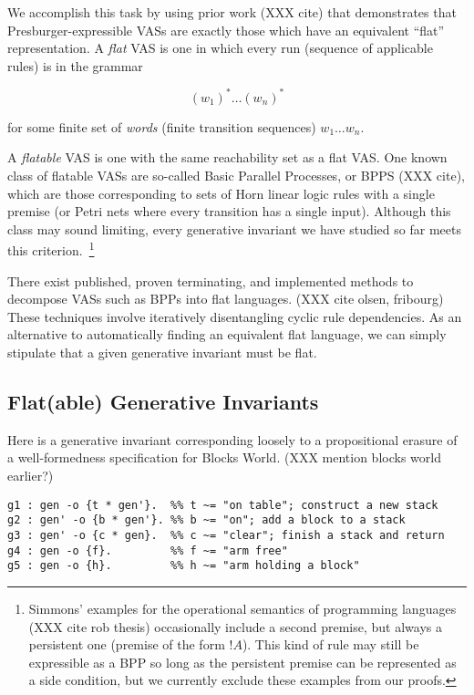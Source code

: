 \documentclass[fullpage, 11pt]{article}
\newcommand{\bang}{!}
\begin{document}
We accomplish this task by using prior work (XXX cite) that demonstrates
that Presburger-expressible VASs are exactly those which have an equivalent
``flat'' representation. A {\em flat} VAS is one in which every run
(sequence of applicable rules) is in the grammar

\[
(w_1)^*\dots(w_n)^*
\]

for some finite set of {\em words} (finite transition sequences) $w_1 \dots
w_n$.

A {\em flatable} VAS is one with the same reachability set as a flat VAS.
One known class of flatable VASs are so-called Basic Parallel Processes, or
BPPS (XXX cite), which are those corresponding to sets of Horn linear logic
rules with a single premise (or Petri nets where every transition has a
single input). Although this class may sound limiting, every generative
invariant we have studied so far meets this criterion.~\footnote{Simmons' examples
for the operational semantics of programming languages (XXX cite rob
thesis) occasionally include a second premise, but always a persistent one
(premise of the form $\bang A$). This kind of rule may still be expressible
as a BPP so long as the persistent premise can be represented as a side
condition, but we currently exclude these examples from our proofs.}

There exist published, proven terminating, and implemented methods to
decompose VASs such as BPPs into flat languages. (XXX cite olsen, fribourg)
These techniques involve iteratively disentangling cyclic rule
dependencies. As an alternative to automatically finding an equivalent flat
language, we can simply stipulate that a given generative invariant must be
flat.

\subsection{Flat(able) Generative Invariants}

Here is a generative invariant corresponding loosely to a propositional
erasure of a well-formedness specification for Blocks World. (XXX mention
blocks world earlier?)

\begin{verbatim}
g1 : gen -o {t * gen'}.  %% t ~= "on table"; construct a new stack
g2 : gen' -o {b * gen'}. %% b ~= "on"; add a block to a stack
g3 : gen' -o {c * gen}.  %% c ~= "clear"; finish a stack and return
g4 : gen -o {f}.         %% f ~= "arm free"
g5 : gen -o {h}.         %% h ~= "arm holding a block"
\end{verbatim}
\end{document}
